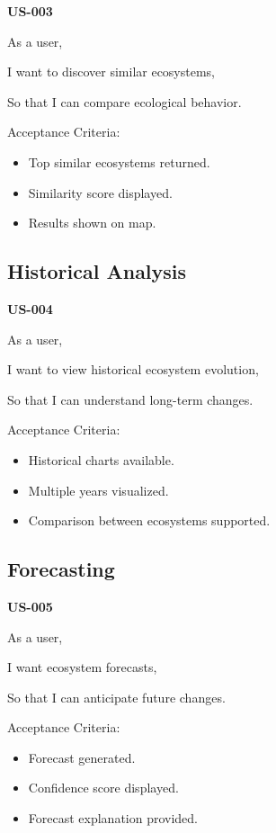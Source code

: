 \documentclass[11pt,a4paper]{article}
\begin{document}
\textbf{US-003}

As a user,

I want to discover similar ecosystems,

So that I can compare ecological behavior.

Acceptance Criteria:

\begin{itemize}
\item Top similar ecosystems returned.
\item Similarity score displayed.
\item Results shown on map.
\end{itemize}


\subsection{Historical Analysis}

\textbf{US-004}

As a user,

I want to view historical ecosystem evolution,

So that I can understand long-term changes.

Acceptance Criteria:

\begin{itemize}
\item Historical charts available.
\item Multiple years visualized.
\item Comparison between ecosystems supported.
\end{itemize}


\subsection{Forecasting}

\textbf{US-005}

As a user,

I want ecosystem forecasts,

So that I can anticipate future changes.

Acceptance Criteria:

\begin{itemize}
\item Forecast generated.
\item Confidence score displayed.
\item Forecast explanation provided.
\end{itemize}
\end{document}
